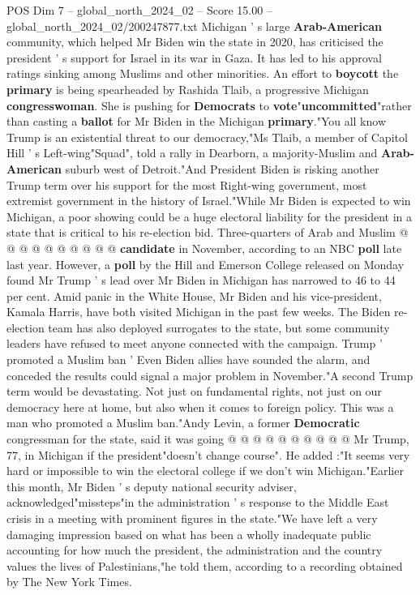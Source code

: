 \begin{textsample}{POS Dim 7 – global\_north\_2024\_02 – Score 15.00 – global\_north\_2024\_02/200247877.txt}  \label{ex:f7_pos_025}
Michigan ' s large \textbf{Arab-American} community, which helped Mr Biden win the state in 2020, has criticised the president ' s support for Israel in its war in Gaza.
It has led to his approval ratings sinking among Muslims and other minorities.
An effort to \textbf{boycott} the \textbf{primary} is being spearheaded by Rashida Tlaib, a progressive Michigan \textbf{congresswoman}.
She is pushing for \textbf{Democrats} to \textbf{vote}"\textbf{uncommitted}"rather than casting a \textbf{ballot} for Mr Biden in the Michigan \textbf{primary}."You all know Trump is an existential threat to our democracy,"Ms Tlaib, a member of Capitol Hill ' s Left-wing"Squad", told a rally in Dearborn, a majority-Muslim and \textbf{Arab-American} suburb west of Detroit."And President Biden is risking another Trump term over his support for the most Right-wing government, most extremist government in the history of Israel."While Mr Biden is expected to win Michigan, a poor showing could be a huge electoral liability for the president in a state that is critical to his re-election bid.
Three-quarters of Arab and Muslim @ @ @ @ @ @ @ @ @ @ \textbf{candidate} in November, according to an NBC \textbf{poll} late last year.
However, a \textbf{poll} by the Hill and Emerson College released on Monday found Mr Trump ' s lead over Mr Biden in Michigan has narrowed to 46 to 44 per cent.
Amid panic in the White House, Mr Biden and his vice-president, Kamala Harris, have both visited Michigan in the past few weeks.
The Biden re-election team has also deployed surrogates to the state, but some community leaders have refused to meet anyone connected with the campaign.
Trump ' promoted a Muslim ban ' Even Biden allies have sounded the alarm, and conceded the results could signal a major problem in November."A second Trump term would be devastating.
Not just on fundamental rights, not just on our democracy here at home, but also when it comes to foreign policy.
This was a man who promoted a Muslim ban."Andy Levin, a former \textbf{Democratic} congressman for the state, said it was going @ @ @ @ @ @ @ @ @ @ Mr Trump, 77, in Michigan if the president"doesn't change course".
He added :"It seems very hard or impossible to win the electoral college if we don't win Michigan."Earlier this month, Mr Biden ' s deputy national security adviser, acknowledged"missteps"in the administration ' s response to the Middle East crisis in a meeting with prominent figures in the state."We have left a very damaging impression based on what has been a wholly inadequate public accounting for how much the president, the administration and the country values the lives of Palestinians,"he told them, according to a recording obtained by The New York Times.

\end{textsample}
